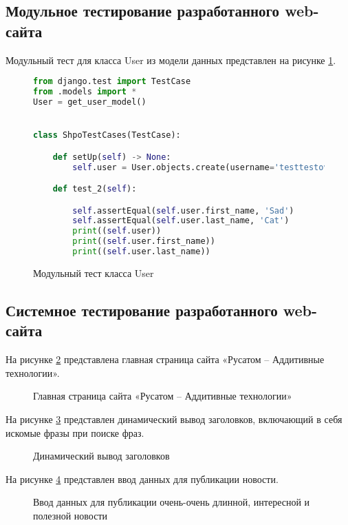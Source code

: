 \subsection{Модульное тестирование разработанного web-сайта}

Модульный тест для класса User из модели данных представлен на рисунке \ref{unitUser:image}.

\begin{figure}[ht]
\begin{lstlisting}[language=Python]
from django.test import TestCase
from .models import *
User = get_user_model()


class ShpoTestCases(TestCase):

    def setUp(self) -> None:
        self.user = User.objects.create(username='testtestovich', password='testtestovich', first_name='Sad', last_name='')

    def test_2(self):

        self.assertEqual(self.user.first_name, 'Sad')
        self.assertEqual(self.user.last_name, 'Cat')
        print((self.user))
        print((self.user.first_name))
        print((self.user.last_name))
\end{lstlisting}  
\caption{Модульный тест класса User}
\label{unitUser:image}
\end{figure}

\subsection{Системное тестирование разработанного web-сайта}

На рисунке \ref{main:image} представлена главная страница сайта «Русатом – Аддитивные технологии».
\newpage %
\begin{figure}[H] %
\caption{Главная страница сайта «Русатом – Аддитивные технологии»}
\label{main:image}
\end{figure}

На рисунке \ref{menu:image} представлен динамический вывод заголовков, включающий в себя искомые фразы при поиске фраз.

\begin{figure}[ht]
\caption{Динамический вывод заголовков}
\label{menu:image}
\end{figure}

На рисунке \ref{enter:image} представлен ввод данных для публикации новости.

\begin{figure}[ht]
\caption{Ввод данных для публикации очень-очень длинной, интересной и полезной новости}
\label{enter:image}
\end{figure}
